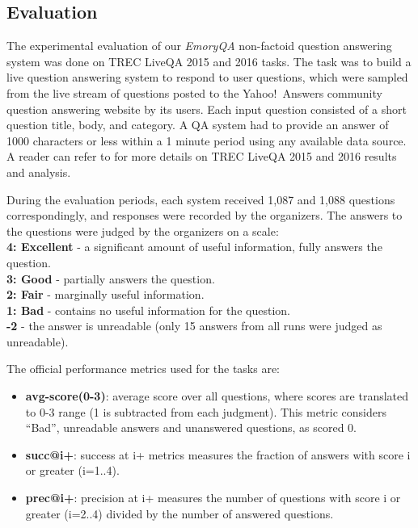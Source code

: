 \subsection{Evaluation}
\label{section:non-factoid:system:evaluation}

The experimental evaluation of our \textit{EmoryQA} non-factoid question answering system was done on TREC LiveQA 2015 and 2016 tasks.
The task was to build a live question answering system to respond to user questions, which were sampled from the live stream of questions posted to the Yahoo!~Answers community question answering website by its users.
Each input question consisted of a short question title, body, and category.
A QA system had to provide an answer of 1000 characters or less within a 1 minute period using any available data source.
A reader can refer to \cite{overviewliveqa15,overviewliveqa16} for more details on TREC LiveQA 2015 and 2016 results and analysis.

During the evaluation periods, each system received 1,087 and 1,088 questions correspondingly, and responses were recorded by the organizers.
The answers to the questions were judged by the organizers on a scale:\\
\textbf{4: Excellent} - a significant amount of useful information, fully answers the question.\\
\textbf{3: Good} - partially answers the question.\\
\textbf{2: Fair} - marginally useful information.\\
\textbf{1: Bad} - contains no useful information for the question.\\
\textbf{-2} - the answer is unreadable (only 15 answers from all runs were judged as unreadable).

The official performance metrics used for the tasks are:
\begin{itemize}[noitemsep]
\item \textbf{avg-score(0-3)}: average score over all questions, where scores are translated to 0-3 range (1 is subtracted from each judgment). This metric considers ``Bad'', unreadable answers and unanswered questions, as scored 0.
\item \textbf{succ@i+}: success at i+ metrics measures the fraction of answers with score i or greater (i=1..4).
\item \textbf{prec@i+}: precision at i+ measures the number of questions with score i or greater (i=2..4) divided by the number of answered questions.
\end{itemize}


